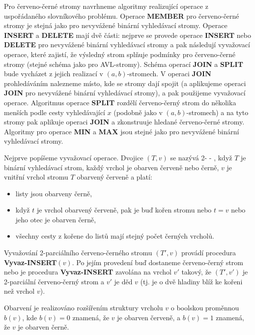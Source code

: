 \documentclass[a4paper,12pt]{article}
\def \emph#1{\underbar{#1}}
\begin{document}
Pro červeno-černé stromy navrhneme algoritmy 
realizující ope\-race z uspořádaného slovní\-ko\-vého problému.  
Operace {\bf MEMBER} pro červeno-černé stromy je stejná jako pro 
nevyvážené binární vyhledávací stromy. Operace 
{\bf IN\-SERT} a {\bf DELETE} mají dvě části:  nejprve se provede 
ope\-race {\bf INSERT} nebo {\bf DELETE} pro nevyvážené binární 
vy\-hledávací stromy a pak následují vyvažovací operace, které 
zajistí, že výsledný strom splňuje pod\-mín\-ky pro červeno-černé 
stromy (stejné schéma jako pro AVL-stromy). Schéma operací 
{\bf JOIN} a {\bf SPLIT} bude vycházet z jejich realizací v $
(a,b)$-stromech. 
V operaci {\bf JOIN} prohledáváním nalezneme místo, kde se 
stromy  
dají spojit (a aplikujeme operaci {\bf JOIN} pro 
nevyvážené 
binární vyhledá\-va\-cí stromy), a pak použijeme 
vyvažovací operace. Algoritmus ope\-race {\bf SPLIT} rozdělí červeno-černý strom 
do několika menších podle cesty vyhledávající $
x$ (podobně jako 
v $(a,b)$-stromech) a na tyto stromy pak aplikuje operaci {\bf JOIN }
a zkonstruuje hledané červeno-černé stromy. Algoritmy pro 
ope\-race {\bf MIN} a {\bf MAX} jsou stejné jako pro nevyvážené binární 
vyhledávací stromy.

Nejprve popíšeme vyvažovací operace. 
Dvojice $(T,v)$ se nazývá 2-\emph{parciální}
\emph{červeno}-\emph{černý} \emph{strom}, když $T$ je 
binární vyhledávací strom, každý vrchol je obarven 
červeně nebo černě, $v$ je 
vnitřní vrchol stromu $T$ obarvený červeně a platí:
\begin{itemize}
\item
listy jsou obarveny černě,
\item
když $t$ je vrchol obarvený červeně, pak je buď kořen 
stromu nebo $t=v$ nebo jeho otec je obarven černě,
\item
všechny cesty z kořene do listů mají stejný 
počet čer\-ných vrcholů.
\end{itemize}

Vyvažování 2-parciálního červeno-černého stromu $(T',v)$ 
pro\-vá\-dí procedura {\bf Vyvaz-IN\-SERT$(v)$}.  Po jejím 
provedení buď do\-sta\-neme čer\-ve\-no-černý strom nebo 
je procedura {\bf Vyvaz-IN\-SERT} zavolána na vrchol $
v'$ takový, 
že $(T',v')$ je 2-parciální červe\-no-černý strom a $
v'$ je děd $v$ 
(tj.  je o dvě hladiny blíž ke kořeni než vrchol $
v$). 

Obarvení je realizováno rozšířením struktury vrcholu $v$ 
o boolskou proměnnou $b(v)$, kde $b(v)=0$ znamená, že $v$ je obarven 
červeně, a $b(v)=1$ znamená, že $v$ je obarven černě.
\end{document}
